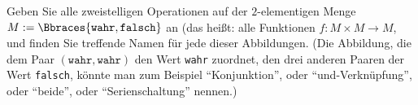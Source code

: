 
\begin{exercise}[16]

Geben Sie alle zweistelligen Operationen auf der $2$-elementigen Menge $M := \Bbraces{\texttt{wahr}, \texttt{falsch}}$ an (das heißt: alle Funktionen $f: M \times M \to M$, und finden Sie treffende Namen für jede dieser Abbildungen.
(Die Abbildung, die dem Paar $(\texttt{wahr}, \texttt{wahr})$ den Wert \texttt{wahr} zuordnet, den drei anderen Paaren der Wert \texttt{falsch}, könnte man zum Beispiel \enquote{Konjunktion}, oder \enquote{und-Verknüpfung}, oder \enquote{beide}, oder \enquote{Serienschaltung} nennen.)

\end{exercise}


